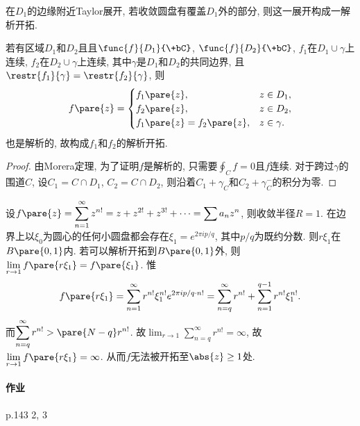 \documentclass[../ComplexVariable.tex]{subfiles}
\begin{document}
\begin{remark}
    在$D_1$的边缘附近Taylor展开, 若收敛圆盘有覆盖$D_1$外的部分, 则这一展开构成一解析开拓.
\end{remark}
若有区域$D_1$和$D_2$且且$\func{f}{D_1}{\+bC}$, $\func{f}{D_2}{\+bC}$, $f_1$在$D_1\cup\gamma$上连续, $f_2$在$D_2\cup\gamma$上连续, 其中$\gamma$是$D_1$和$D_2$的共同边界, 且$\restr{f_1}{\gamma} = \restr{f_2}{\gamma}$, 则
\[ f\pare{z} = \begin{cases}
    f_1\pare{z},& z\in D_1, \\
    f_2\pare{z},& z\in D_2, \\
    f_1\pare{z} = f_2\pare{z}, & z\in \gamma.
\end{cases} \]
也是解析的, 故构成$f_1$和$f_2$的解析开拓.
\begin{figure}[ht]
    \centering
\end{figure}
\begin{proof}
    由Morera定理, 为了证明$f$是解析的, 只需要$\displaystyle \oint_C f = 0$且$f$连续. 对于跨过$\gamma$的围道$C$, 设$C_1 = C\cap D_1$, $C_2 = C\cap D_2$, 则沿着$C_1 + \gamma_C$和$C_2 + \gamma^-_C$的积分为零.
\end{proof}
\begin{sample}
    \begin{ex}
        设$f\pare{z} = \displaystyle \sum_{n=1}^\infty z^{n!} = z + z^{2!} + z^{3!} + \cdots = \sum a_n z^n$, 则收敛半径$R=1$. 在边界上以$\xi_0$为圆心的任何小圆盘都会存在$\xi_1 = e^{2\pi i p/q}$, 其中$p/q$为既约分数. 则$r\xi_1$在$B\pare{0,1}$内. 若可以解析开拓到$B\pare{0,1}$外, 则$\displaystyle \lim_{r\rightarrow 1} f\pare{r\xi_1} = f\pare{\xi_1}$. 惟
        \[ f\pare{r\xi_1} = \sum_{n=1}^\infty r^{n!}\xi_1^{n!} e^{2\pi ip/q\cdot n!} = \sum_{n=q}^\infty r^{n!} + \sum_{n=1}^{q-1} r^{n!}\xi_1^{n!}. \]
        而$\displaystyle \sum_{n=q}^\infty r^{n!} > \pare{N-q}r^{n!}$. 故$\displaystyle \lim_{r\rightarrow 1} \sum_{n=q}^\infty r^{n!} = \infty$, 故$\displaystyle \lim_{r\rightarrow 1} f\pare{r\xi_1} = \infty$. 从而$f$无法被开拓至$\abs{z}\ge 1$处.
    \end{ex}
\end{sample}

\paragraph{作业} %
\label{par:作业}

p.143 2, 3

\end{document}
